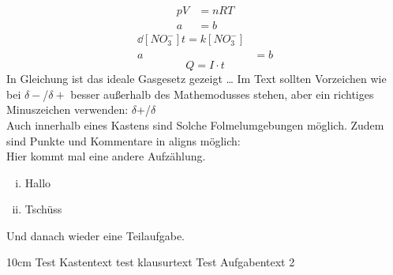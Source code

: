 \documentclass[./main.tex]{subfiles}
\begin{document}
\begin{align}
    pV &= nRT \label{G:test-Gl}\\
    a &= b
\end{align}
\begin{align*}
    \dd{[NO_3^-]}{t}  = k [NO_3^-]\\
    a &= b
\end{align*}
\begin{equation*}
    Q = I \cdot t
\end{equation*}
In Gleichung ist das ideale Gasgesetz gezeigt \ldots 
Im Text sollten Vorzeichen wie bei $\delta-$/$\delta+$ besser au\ss{}erhalb des Mathemodusses stehen, aber ein richtiges Minuszeichen verwenden: $\delta$+/$\delta$\textminus{}\\
Auch innerhalb eines Kastens sind Solche Folmelumgebungen möglich. Zudem sind Punkte und Kommentare in aligns möglich:\\
Hier kommt mal eine andere Aufz\"ahlung.\\
\begin{enumerate}[(i)]
    \item Hallo
    \item Tsch\"uss
\end{enumerate}

Und danach wieder eine Teilaufgabe.
\newpage
{}

\punktekasten
{10cm}
{Test Kastentext}
{test klausurtext}
{Test Aufgabentext}
{2}



\aufgabenende
\end{document}
